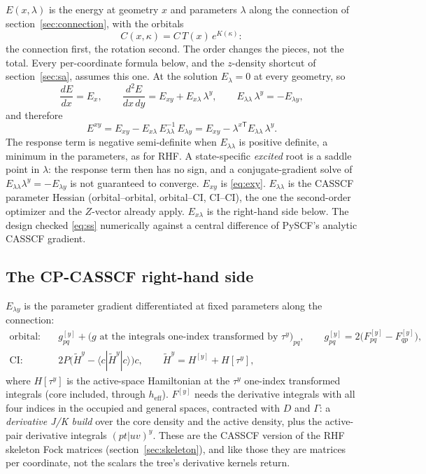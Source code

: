 \documentclass[11pt]{article}
\newcommand{\Exy}{E^{xy}}
\begin{document}
$E(x, \lambda)$ is the energy at geometry $x$ and parameters $\lambda$
along the connection of section~\ref{sec:connection}, with the orbitals
\begin{equation}
  C(x, \kappa) = C\,T(x)\,e^{K(\kappa)}:
  \label{eq:order}
\end{equation}
the connection first, the rotation second. The order changes the pieces,
not the total. Every per-coordinate formula below, and the $z$-density
shortcut of section~\ref{sec:sa}, assumes this one. At the solution
$E_\lambda = 0$ at every geometry, so
\begin{equation}
  \frac{d E}{dx} = E_x, \qquad
  \frac{d^2 E}{dx\,dy} = E_{xy} + E_{x\lambda}\,\lambda^y,
  \qquad E_{\lambda\lambda}\,\lambda^y = -E_{\lambda y},
\end{equation}
and therefore
\begin{equation}
\boxed{\;
  \Exy = E_{xy} - E_{x\lambda}\,E_{\lambda\lambda}^{-1}\,E_{\lambda y}
       = E_{xy} - \lambda^{x\mathsf T}E_{\lambda\lambda}\,\lambda^y.\;}
  \label{eq:ss}
\end{equation}
The response term is negative semi-definite when $E_{\lambda\lambda}$ is
positive definite, a minimum in the parameters, as for RHF. A
state-specific \emph{excited} root is a saddle point in $\lambda$: the
response term then has no sign, and a conjugate-gradient solve of
$E_{\lambda\lambda}\lambda^y = -E_{\lambda y}$ is not guaranteed to
converge.
$E_{xy}$ is \eqref{eq:exy}. $E_{\lambda\lambda}$ is the CASSCF parameter
Hessian (orbital--orbital, orbital--CI, CI--CI), the one the second-order
optimizer and the $Z$-vector already apply. $E_{x\lambda}$ is the
right-hand side below. The design checked \eqref{eq:ss} numerically
against a central difference of PySCF's analytic CASSCF gradient.

\subsection{The CP-CASSCF right-hand side}

$E_{\lambda y}$ is the parameter gradient differentiated at fixed
parameters along the connection:
\begin{align}
  \text{orbital:}\quad & g^{[y]}_{pq} + \bigl(\text{$g$ at the integrals
     one-index transformed by } \tau^y\bigr)_{pq},
     \qquad g^{[y]}_{pq} = 2\bigl(F^{[y]}_{pq} - F^{[y]}_{qp}\bigr),
     \label{eq:rhs-orb}\\
  \text{CI:}\quad & 2P\bigl(\tilde H^{y} - \langle c|\tilde H^{y}|c\rangle\bigr)c,
     \qquad \tilde H^{y} = H^{[y]} + H[\tau^y],
     \label{eq:rhs-ci}
\end{align}
where $H[\tau^y]$ is the active-space Hamiltonian at the $\tau^y$
one-index transformed integrals (core included, through $h_{\mathrm{eff}}$).
$F^{[y]}$ needs the derivative integrals with all four indices in the
occupied and general spaces, contracted with $D$ and $\Gamma$: a
\emph{derivative J/K build} over the core density and the active density,
plus the active-pair derivative integrals $(pt|uv)^y$. These are the
CASSCF version of the RHF skeleton Fock matrices
(section~\ref{sec:skeleton}), and like those they are matrices per
coordinate, not the scalars the tree's derivative kernels return.
\end{document}
